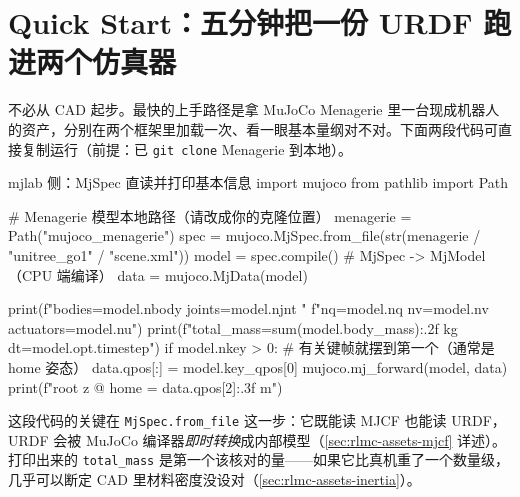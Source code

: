 \section{Quick Start：五分钟把一份 URDF 跑进两个仿真器}
\label{sec:rlmc-assets-quickstart}

不必从 CAD 起步。最快的上手路径是拿 MuJoCo Menagerie 里一台现成机器人的资产，分别在两个框架里加载一次、看一眼基本量纲对不对。下面两段代码可直接复制运行（前提：已 \verb|git clone| Menagerie 到本地）。

\begin{codebox}[Python]{mjlab 侧：MjSpec 直读并打印基本信息}
import mujoco
from pathlib import Path

# Menagerie 模型本地路径（请改成你的克隆位置）
menagerie = Path("mujoco_menagerie")
spec = mujoco.MjSpec.from_file(str(menagerie / "unitree_go1" / "scene.xml"))
model = spec.compile()            # MjSpec -> MjModel（CPU 端编译）
data = mujoco.MjData(model)

print(f"bodies={model.nbody} joints={model.njnt} "
      f"nq={model.nq} nv={model.nv} actuators={model.nu}")
print(f"total_mass={sum(model.body_mass):.2f} kg  dt={model.opt.timestep}")
if model.nkey > 0:                # 有关键帧就摆到第一个（通常是 home 姿态）
    data.qpos[:] = model.key_qpos[0]
    mujoco.mj_forward(model, data)
    print(f"root z @ home = {data.qpos[2]:.3f} m")
\end{codebox}

这段代码的关键在 \texttt{MjSpec.from\_file} 这一步：它既能读 MJCF 也能读 URDF，URDF 会被 MuJoCo 编译器\emph{即时转换}成内部模型（\cref{sec:rlmc-assets-mjcf} 详述）。打印出来的 \verb|total_mass| 是第一个该核对的量——如果它比真机重了一个数量级，几乎可以断定 CAD 里材料密度没设对（\cref{sec:rlmc-assets-inertia}）。

